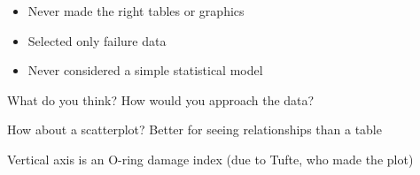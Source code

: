 \documentclass[pdflatex,landscape,titlepage]{foils}
\begin{document}
\begin{itemize}
\item Never made the right tables or graphics

\item Selected only failure data

\item Never considered a simple statistical model

\end{itemize}

What do you think?  How would you approach the data?


How about a scatterplot?  Better for seeing relationships than a table

Vertical axis is an O-ring damage index (due to Tufte, who made the plot)
\end{document}
